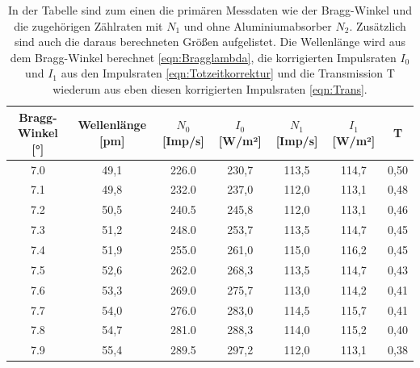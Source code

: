 \documentclass[titlepage = firstcover]{scrartcl}
\begin{document}
    \begin{table}[h]
        \centering
        \caption{In der Tabelle sind zum einen die primären Messdaten wie der Bragg-Winkel und die zugehörigen Zählraten mit $N_1$ und ohne Aluminiumabsorber $N_2$. Zusätzlich sind auch die daraus berechneten Größen aufgelistet. Die Wellenlänge wird aus dem Bragg-Winkel berechnet \ref{eqn:Bragglambda}, die korrigierten Impulsraten $I_0$ und $I_1$ aus den Impulsraten \ref{eqn:Totzeitkorrektur} und die Transmission T wiederum aus eben diesen korrigierten Impulsraten \ref{eqn:Trans}.}
        \label{tab:Transmission}

        \begin{tabular}{c c c c c c c}
            \toprule
            {Bragg-Winkel [°]}  & {Wellenlänge [pm]} & {$N_0$ [Imp/s]} & {$I_0$ [W/m²]} & {$N_1$ [Imp/s]} & {$I_1$ [W/m²]} & {T} \\ 
            \midrule
            7.0	                &  49,1              &  226.0          &    230,7       &    113,5        &    114,7       &  0,50 \\
            7.1	                &  49,8              &  232.0          &    237,0       &    112,0        &    113,1       &  0,48 \\
            7.2	                &  50,5              &  240.5          &    245,8       &    112,0        &    113,1       &  0,46 \\
            7.3	                &  51,2              &  248.0          &    253,7       &    113,5        &    114,7       &  0,45 \\
            7.4	                &  51,9              &  255.0          &    261,0       &    115,0        &    116,2       &  0,45 \\
            7.5	                &  52,6              &  262.0          &    268,3       &    113,5        &    114,7       &  0,43 \\
            7.6	                &  53,3              &  269.0          &    275,7       &    113,0        &    114,2       &  0,41 \\
            7.7	                &  54,0              &  276.0          &    283,0       &    114,5        &    115,7       &  0,41 \\
            7.8	                &  54,7              &  281.0          &    288,3       &    114,0        &    115,2       &  0,40 \\
            7.9	                &  55,4              &  289.5          &    297,2       &    112,0        &    113,1       &  0,38 \\

\end{tabular}
\end{table}
\end{document}
